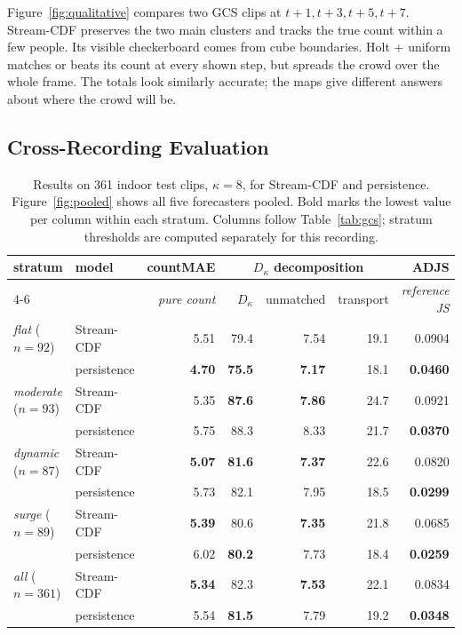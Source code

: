 \documentclass{article}
\begin{document}
Figure~\ref{fig:qualitative} compares two GCS clips at $t{+}1, t{+}3, t{+}5, t{+}7$. Stream-CDF preserves the two main clusters and tracks the true count within a few people. Its visible checkerboard comes from cube boundaries. Holt + uniform matches or beats its count at every shown step, but spreads the crowd over the whole frame. The totals look similarly accurate; the maps give different answers about where the crowd will be.

\subsection{Cross-Recording Evaluation}
\label{sec:results-indoor}

\begin{table}[t]
  \centering
  \small
  \setlength{\tabcolsep}{6pt}
  \begin{tabular}{llrrrrr}
    \toprule
    \textbf{stratum} & \textbf{model} & countMAE & \multicolumn{3}{c}{$D_\kappa$ decomposition} & ADJS \\
    \cmidrule(lr){4-6}
     &  & \scriptsize\emph{pure count} & $D_\kappa$ & unmatched & transport & \scriptsize\emph{reference JS} \\
    \midrule
    \emph{flat} ($n=92$) & Stream-CDF & 5.51 & 79.4 & 7.54 & 19.1 & 0.0904 \\
     & persistence & \textbf{4.70} & \textbf{75.5} & \textbf{7.17} & 18.1 & \textbf{0.0460} \\
    \midrule
    \emph{moderate} ($n=93$) & Stream-CDF & 5.35 & \textbf{87.6} & \textbf{7.86} & 24.7 & 0.0921 \\
     & persistence & 5.75 & 88.3 & 8.33 & 21.7 & \textbf{0.0370} \\
    \midrule
    \emph{dynamic} ($n=87$) & Stream-CDF & \textbf{5.07} & \textbf{81.6} & \textbf{7.37} & 22.6 & 0.0820 \\
     & persistence & 5.73 & 82.1 & 7.95 & 18.5 & \textbf{0.0299} \\
    \midrule
    \emph{surge} ($n=89$) & Stream-CDF & \textbf{5.39} & 80.6 & \textbf{7.35} & 21.8 & 0.0685 \\
     & persistence & 6.02 & \textbf{80.2} & 7.73 & 18.4 & \textbf{0.0259} \\
    \midrule
    \emph{all} ($n=361$) & Stream-CDF & \textbf{5.34} & 82.3 & \textbf{7.53} & 22.1 & 0.0834 \\
     & persistence & 5.54 & \textbf{81.5} & 7.79 & 19.2 & \textbf{0.0348} \\
    \bottomrule
  \end{tabular}
  \caption{Results on 361 indoor test clips, $\kappa = 8$, for Stream-CDF and persistence. Figure~\ref{fig:pooled} shows all five forecasters pooled. Bold marks the lowest value per column within each stratum. Columns follow Table~\ref{tab:gcs}; stratum thresholds are computed separately for this recording.}
  \label{tab:indoor}
\end{table}
\end{document}
